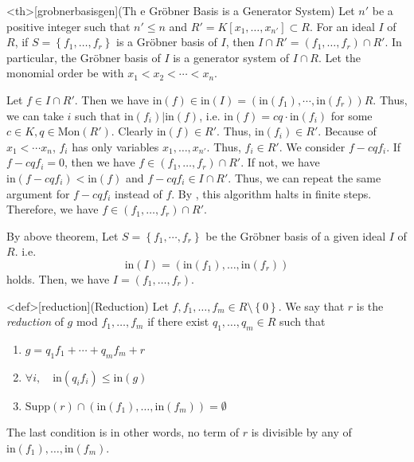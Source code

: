 \documentclass{article}
\begin{document}
\begin{statementsp}<th>[grobnerbasisgen](Th e Gr\"{o}bner Basis is a Generator System)
    Let $n'$ be a positive integer such that $n' \leq n$ and $R' = K[x_1, \ldots, x_{n'}] \subset R$. For an ideal $I$ of $R$, if $S = \left\{ f_1, \ldots, f_r \right\}$ is a Gr\"{o}bner basis of $I$, then $I \cap R' = (f_1, \ldots, f_r) \cap R'$. In particular, the Gr\"{o}bner basis of $I$ is a generator system of $I \cap R$.
    Let the monomial order be with $x_1 < x_2 < \cdots < x_n$.
\end{statementsp}
\begin{pfsp}
    Let $f \in I \cap R'$. Then we have $\mathrm{in}(f) \in \mathrm{in}(I) = \left( \mathrm{in}(f_1), \cdots, \mathrm{in}(f_r) \right) R$. Thus, we can take $i$ such that $\mathrm{in}(f_i) \vert \mathrm{in}(f)$, i.e. $\mathrm{in}(f) = cq \cdot \mathrm{in}(f_i)$ for some $c \in K, q \in \mathrm{Mon}(R')$. Clearly $\mathrm{in}(f) \in R'$. Thus, $\mathrm{in}(f_i) \in R'$. Because of $x_1 < \cdots  x_n$, $f_i$ has only variables $x_1, \ldots, x_{n'}$. Thus, $f_i \in R'$. We consider $f - cq f_i$. If $f - cq f_i = 0$, then we have $f \in (f_1, \ldots, f_r) \cap R'$. If not, we have $\mathrm{in}(f - cq f_i) < \mathrm{in}(f)$ and $f - cq f_i \in I \cap R'$. Thus, we can repeat the same argument for $f - cq f_i$ instead of $f$. By , this algorithm halts in finite steps. Therefore, we have $f \in (f_1, \ldots, f_r) \cap R'$.
\end{pfsp}

By above theorem, Let $S = \left\{ f_1, \cdots, f_r \right\}$ be the Gr\"{o}bner basis of a given ideal $I$ of $R$. i.e. $$\mathrm{in}(I) = \left( \mathrm{in}(f_1), \ldots, \mathrm{in}(f_r) \right)$$ holds. Then, we have $I = (f_1, \ldots, f_r)$. 

\begin{statementsp}<def>[reduction](Reduction)
    Let $f, f_1, \ldots, f_m \in R \setminus \left\{ 0 \right\}$. We say that $r$ is the \textit{reduction} of $g$ mod $f_1, \ldots, f_m$ if there exist $q_1, \ldots, q_m \in R$ such that
    \begin{enumerate}
        \item $g = q_1 f_1 + \cdots + q_m f_m + r$
        \item $\forall i, \quad \mathrm{in}(q_i f_i) \leq \mathrm{in}(g)$
        \item $\mathrm{Supp}(r) \cap (\mathrm{in}(f_1), \ldots, \mathrm{in}(f_m)) = \emptyset$
    \end{enumerate}
    The last condition is in other words, no term of $r$ is divisible by any of $\mathrm{in}(f_1), \ldots, \mathrm{in}(f_m)$.
\end{statementsp}
\end{document}
